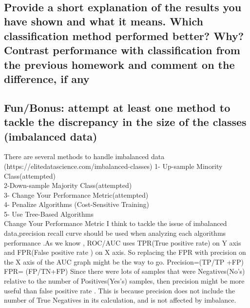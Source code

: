 \\



\subsection{Provide a short explanation of the results you have shown and what it means. Which classification method performed better? Why? Contrast performance with classification from the previous homework and comment on the difference, if any}




\subsection{ Fun/Bonus: attempt at least one method to tackle the discrepancy in the size of the classes (imbalanced data)}
There are several methods to handle imbalanced data (https://elitedatascience.com/imbalanced-classes)
1- Up-sample Minority Class(attempted)\\
2-Down-sample Majority Class(attempted)\\
3- Change Your Performance Metric(attempted)\\
4- Penalize Algorithms (Cost-Sensitive Training)\\
5- Use Tree-Based Algorithms\\
Change Your Performance Metric
 I think to tackle the issue of imbalanced data,precision  recall curve should be used when analyzing each algorithms performance  .As we know , ROC/AUC uses TPR(True positive rate) on Y axis and FPR(False positive rate ) on X axis. So replacing the FPR with precision on the X axis of the AUC graph might be the way to go.
 Precision=(TP/TP +FP) FPR= (FP/TN+FP)
 Since there were lots of samples that were Negatives(No's) relative to the number of Positives(Yes's) samples, then precision might be more useful than false positive rate . This is because precision does not include the number of True Negatives in its calculation, and is not affected by imbalance.



